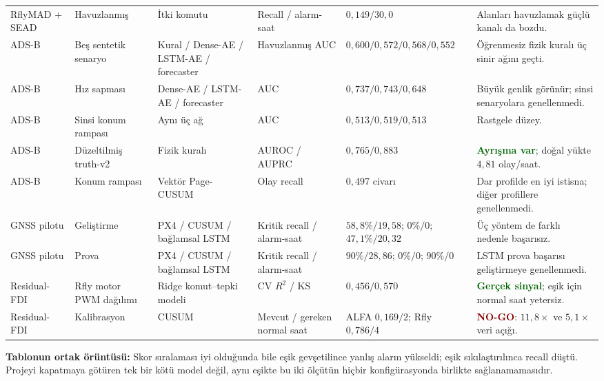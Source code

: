 \documentclass[10pt,a4paper]{article}
\newcommand{\good}[1]{\textcolor{darkgreen}{\textbf{#1}}}
\newcommand{\bad}[1]{\textcolor{darkred}{\textbf{#1}}}
\begin{document}
\begin{landscape}
\begin{longtable}{p{2.2cm}p{3.0cm}p{3.5cm}p{3.0cm}p{3.0cm}p{4.3cm}}
RflyMAD + SEAD & Havuzlanmış & İtki komutu & Recall / alarm-saat &
$0{,}149 / 30{,}0$ & Alanları havuzlamak güçlü kanalı da bozdu. \\

ADS-B & Beş sentetik senaryo & Kural / Dense-AE / LSTM-AE / forecaster & Havuzlanmış AUC &
$0{,}600 / 0{,}572 / 0{,}568 / 0{,}552$ & Öğrenmesiz fizik kuralı üç sinir ağını geçti. \\

ADS-B & Hız sapması & Dense-AE / LSTM-AE / forecaster & AUC &
$0{,}737 / 0{,}743 / 0{,}648$ & Büyük genlik görünür; sinsi senaryolara genellenmedi. \\

ADS-B & Sinsi konum rampası & Aynı üç ağ & AUC &
$0{,}513 / 0{,}519 / 0{,}513$ & Rastgele düzey. \\

ADS-B & Düzeltilmiş truth-v2 & Fizik kuralı & AUROC / AUPRC &
$0{,}765 / 0{,}883$ & \good{Ayrışma var}; doğal yükte $4{,}81$ olay/saat. \\

ADS-B & Konum rampası & Vektör Page-CUSUM & Olay recall & $0{,}497$ civarı &
Dar profilde en iyi istisna; diğer profillere genellenmedi. \\

GNSS pilotu & Geliştirme & PX4 / CUSUM / bağlamsal LSTM & Kritik recall / alarm-saat &
$58{,}8\%/19{,}58$; $0\%/0$; $47{,}1\%/20{,}32$ & Üç yöntem de farklı nedenle başarısız. \\

GNSS pilotu & Prova & PX4 / CUSUM / bağlamsal LSTM & Kritik recall / alarm-saat &
$90\%/28{,}86$; $0\%/0$; $90\%/0$ & LSTM prova başarısı geliştirmeye genellenmedi. \\

Residual-FDI & Rfly motor PWM dağılımı & Ridge komut--tepki modeli & CV $R^2$ / KS &
$0{,}456 / 0{,}570$ & \good{Gerçek sinyal}; eşik için normal saat yetersiz. \\

Residual-FDI & Kalibrasyon & CUSUM & Mevcut / gereken normal saat &
ALFA $0{,}169/2$; Rfly $0{,}786/4$ & \bad{NO-GO}: $11{,}8\times$ ve $5{,}1\times$ veri açığı. \\
\bottomrule
\end{longtable}
\end{landscape}

\begin{lessonbox}
\textbf{Tablonun ortak örüntüsü:} Skor sıralaması iyi olduğunda bile eşik
gevşetilince yanlış alarm yükseldi; eşik sıkılaştırılınca recall düştü. Projeyi
kapatmaya götüren tek bir kötü model değil, aynı eşikte bu iki ölçütün hiçbir
konfigürasyonda birlikte sağlanamamasıdır.
\end{lessonbox}
\end{document}
